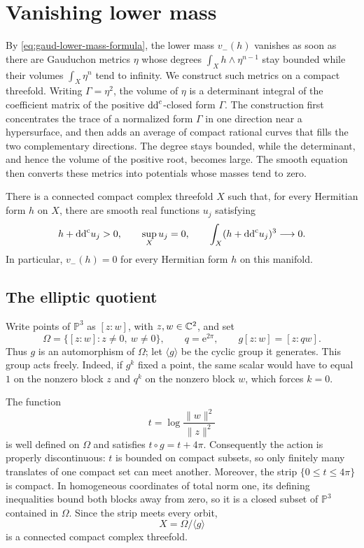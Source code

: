 \section{Vanishing lower mass}
\label{sec:vanishing-lower-mass}

By \eqref{eq:gaud-lower-mass-formula}, the lower mass $v_-(h)$ vanishes as soon as there are Gauduchon metrics $\eta$ whose degrees $\int_Xh\wedge\eta^{n-1}$ stay bounded while their volumes $\int_X\eta^n$ tend to infinity. We construct such metrics on a compact threefold. Writing $\Gamma=\eta^2$, the volume of $\eta$ is a determinant integral of the coefficient matrix of the positive $\mathrm{dd}^{\mathrm{c}}$-closed form $\Gamma$. The construction first concentrates the trace of a normalized form $\Gamma$ in one direction near a hypersurface, and then adds an average of compact rational curves that fills the two complementary directions. The degree stays bounded, while the determinant, and hence the volume of the positive root, becomes large. The smooth equation then converts these metrics into potentials whose masses tend to zero.

\begin{theorem}\label{thm:vanishing-lower-mass}
There is a connected compact complex threefold $X$ such that, for every Hermitian form $h$ on $X$, there are smooth real functions $u_j$ satisfying
\[
 h+\mathrm{dd}^{\mathrm{c}} u_j>0,\qquad \sup_Xu_j=0,\qquad
 \int_X(h+\mathrm{dd}^{\mathrm{c}} u_j)^3\longrightarrow0.
\]
In particular, $v_-(h)=0$ for every Hermitian form $h$ on this manifold.
\end{theorem}

\subsection{The elliptic quotient}\label{subsec:lower-mass-elliptic-quotient}

Write points of $\mathbb P^3$ as $[z:w]$, with $z,w\in\mathbb C^2$, and set
\[
 \Omega=\{[z:w]:z\ne0,\ w\ne0\},\qquad
 q=\mathrm{e}^{2\pi},\qquad g[z:w]=[z:qw].
\]
Thus $g$ is an automorphism of $\Omega$; let $\langle g\rangle$ be the cyclic group it generates. This group acts freely. Indeed, if $g^k$ fixed a point, the same scalar would have to equal $1$ on the nonzero block $z$ and $q^k$ on the nonzero block $w$, which forces $k=0$.

The function
\[
 t=\log\frac{\|w\|^2}{\|z\|^2}
\]
is well defined on $\Omega$ and satisfies $t\circ g=t+4\pi$. Consequently the action is properly discontinuous: $t$ is bounded on compact subsets, so only finitely many translates of one compact set can meet another. Moreover, the strip $\{0\leq t\leq4\pi\}$ is compact. In homogeneous coordinates of total norm one, its defining inequalities bound both blocks away from zero, so it is a closed subset of $\mathbb P^3$ contained in $\Omega$. Since the strip meets every orbit,
\[
 X=\Omega/\langle g\rangle
\]
is a connected compact complex threefold.

